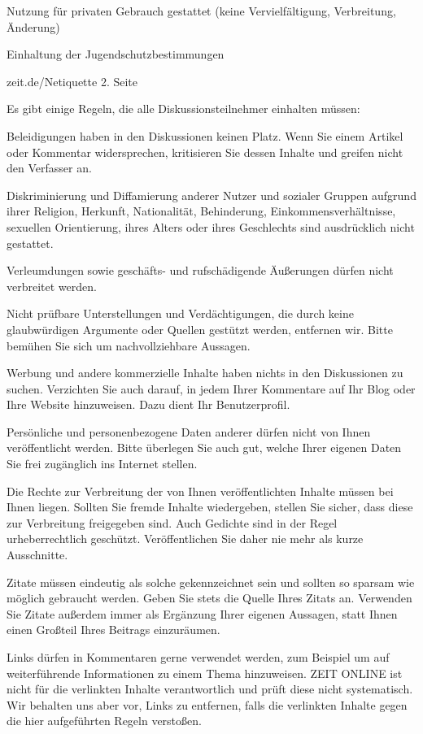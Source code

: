 Nutzung für privaten Gebrauch gestattet (keine Vervielfältigung, Verbreitung, Änderung)

Einhaltung der Jugendschutzbestimmungen

zeit.de/Netiquette 2. Seite

Es gibt einige Regeln, die alle Diskussionsteilnehmer einhalten müssen:
 
 Beleidigungen haben in den Diskussionen keinen Platz. Wenn Sie einem Artikel oder Kommentar widersprechen, kritisieren Sie dessen Inhalte und greifen nicht den Verfasser an.

Diskriminierung und Diffamierung anderer Nutzer und sozialer Gruppen aufgrund ihrer Religion, Herkunft, Nationalität, Behinderung, Einkommensverhältnisse, sexuellen Orientierung, ihres Alters oder ihres Geschlechts sind ausdrücklich nicht gestattet.

Verleumdungen sowie geschäfts- und rufschädigende Äußerungen dürfen nicht verbreitet werden.

Nicht prüfbare Unterstellungen und Verdächtigungen, die durch keine glaubwürdigen Argumente oder Quellen gestützt werden, entfernen wir. Bitte bemühen Sie sich um nachvollziehbare Aussagen.

Werbung und andere kommerzielle Inhalte haben nichts in den Diskussionen zu suchen. Verzichten Sie auch darauf, in jedem Ihrer Kommentare auf Ihr Blog oder Ihre Website hinzuweisen. Dazu dient Ihr Benutzerprofil.

Persönliche und personenbezogene Daten anderer dürfen nicht von Ihnen veröffentlicht werden. Bitte überlegen Sie auch gut, welche Ihrer eigenen Daten Sie frei zugänglich ins Internet stellen.

Die Rechte zur Verbreitung der von Ihnen veröffentlichten Inhalte müssen bei Ihnen liegen. Sollten Sie fremde Inhalte wiedergeben, stellen Sie sicher, dass diese zur Verbreitung freigegeben sind. Auch Gedichte sind in der Regel urheberrechtlich geschützt. Veröffentlichen Sie daher nie mehr als kurze Ausschnitte.

Zitate müssen eindeutig als solche gekennzeichnet sein und sollten so sparsam wie möglich gebraucht werden. Geben Sie stets die Quelle Ihres Zitats an. Verwenden Sie Zitate außerdem immer als Ergänzung Ihrer eigenen Aussagen, statt Ihnen einen Großteil Ihres Beitrags einzuräumen.

Links dürfen in Kommentaren gerne verwendet werden, zum Beispiel um auf weiterführende Informationen zu einem Thema hinzuweisen. ZEIT ONLINE ist nicht für die verlinkten Inhalte verantwortlich und prüft diese nicht systematisch. Wir behalten uns aber vor, Links zu entfernen, falls die verlinkten Inhalte gegen die hier aufgeführten Regeln verstoßen.